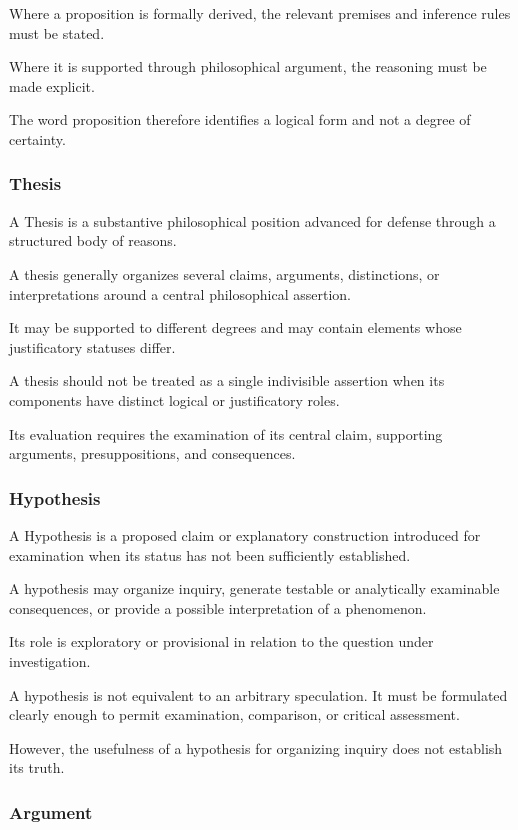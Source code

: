 Where a proposition
is formally derived,
the relevant premises
and inference rules
must be stated.

Where it is supported
through philosophical
argument, the reasoning
must be made explicit.

The word proposition
therefore identifies
a logical form and
not a degree of certainty.

\subsubsection{Thesis}

A Thesis is a substantive
philosophical position
advanced for defense
through a structured
body of reasons.

A thesis generally
organizes several claims,
arguments, distinctions,
or interpretations
around a central
philosophical assertion.

It may be supported
to different degrees
and may contain
elements whose
justificatory statuses
differ.

A thesis should not
be treated as a single
indivisible assertion
when its components
have distinct logical
or justificatory roles.

Its evaluation requires
the examination of
its central claim,
supporting arguments,
presuppositions,
and consequences.

\subsubsection{Hypothesis}

A Hypothesis is a proposed
claim or explanatory
construction introduced
for examination when
its status has not
been sufficiently
established.

A hypothesis may
organize inquiry,
generate testable
or analytically
examinable consequences,
or provide a possible
interpretation of
a phenomenon.

Its role is exploratory
or provisional in
relation to the
question under
investigation.

A hypothesis is
not equivalent to
an arbitrary speculation.
It must be formulated
clearly enough to
permit examination,
comparison, or
critical assessment.

However, the usefulness
of a hypothesis for
organizing inquiry
does not establish
its truth.

\subsubsection{Argument}

